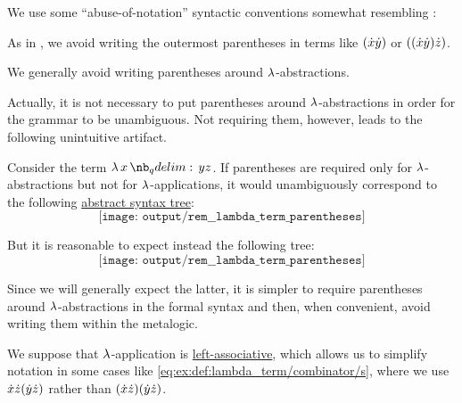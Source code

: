 \begin{remark}\label{rem:lambda_term_parentheses}
  We use some \enquote{abuse-of-notation} syntactic conventions somewhat resembling :
  \begin{thmenum}
     As in , we avoid writing the outermost parentheses in terms like \( ({\dot{x}} {\dot{y}}) \) or \( (({\dot{x}} {\dot{y}}) {\dot{z}}) \).

     We generally avoid writing parentheses around \( \mathrm{\lambda} \)-abstractions.

    Actually, it is not necessary to put parentheses around \( \mathrm{\lambda} \)-abstractions in order for the grammar to be unambiguous. Not requiring them, however, leads to the following unintuitive artifact.

    Consider the term \( \qabs x y z \). If parentheses are required only for \( \mathrm{\lambda} \)-abstractions but not for \( \mathrm{\lambda} \)-applications, it would unambiguously correspond to the following \hyperref[rem:lambda_term_ast]{abstract syntax tree}:
    \begin{equation*}
      \texttt{[image: output/rem\_\_lambda\_term\_parentheses]}
    \end{equation*}

    But it is reasonable to expect instead the following tree:
    \begin{equation*}
      \texttt{[image: output/rem\_\_lambda\_term\_parentheses]}
    \end{equation*}

    Since we will generally expect the latter, it is simpler to require parentheses around \( \mathrm{\lambda} \)-abstractions in the formal syntax and then, when convenient, avoid writing them within the metalogic.

     We suppose that \( \mathrm{\lambda} \)-application is \hyperref[rem:binary_operation_syntax_trees/associativity]{left-associative}, which allows us to simplify notation in some cases like \eqref{eq:ex:def:lambda_term/combinator/s}, where we use \( {\dot{x}} {\dot{z}} ({\dot{y}} {\dot{z}}) \) rather than \( ({\dot{x}} {\dot{z}})({\dot{y}} {\dot{z}}) \).
  \end{thmenum}
\end{remark}

